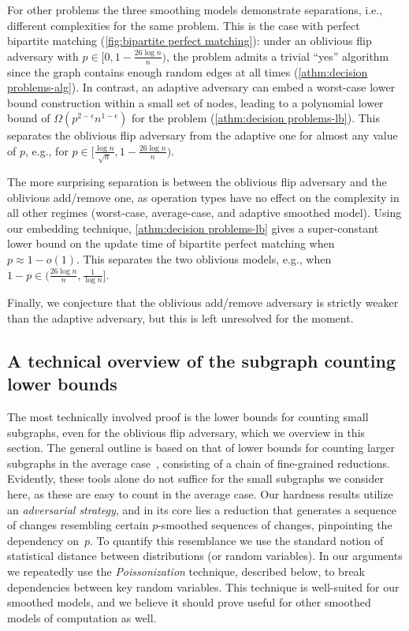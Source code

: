 \documentclass[letter,11pt]{article}
\begin{document}
For other problems the three smoothing models demonstrate separations, i.e., different complexities for the same problem.
This is the case with perfect bipartite matching (\cref{fig:bipartite perfect matching}):
under an oblivious flip adversary with $p\in[0,1-\frac{26\log n}{n})$, the problem admits a trivial ``yes'' algorithm since the graph contains enough random edges at all times (\cref{athm:decision problems-alg}).
In contrast, an adaptive adversary can embed a worst-case lower bound construction within a small set of nodes, leading to a polynomial lower bound of $\Omega(p^{2-\epsilon}n^{1-\epsilon})$ for the problem (\cref{athm:decision problems-lb}).
This separates the oblivious flip adversary from the adaptive one for almost any value of $p$, e.g., for $p\in \big[\frac{\log n}{\sqrt n},1-\frac{26\log n}{n}\big)$.

The more surprising separation is between the 
oblivious flip adversary and the oblivious add/remove one, 
as operation types have no effect on the complexity in all other regimes (worst-case, average-case, and adaptive smoothed model).
Using our embedding technique,  \cref{athm:decision problems-lb} gives a super-constant lower bound on the update time of bipartite perfect matching when $p \approx 1 - o(1)$. This separates the two oblivious models,
e.g.,
when $1 - p\in \big(\frac{26\log n}{n},\frac{1}{\log n}\big]$.


Finally, we conjecture that the oblivious add/remove adversary is strictly weaker than the adaptive adversary, but this is left unresolved for the moment.


\subsection{A technical overview of the subgraph counting lower bounds}
\label{sec:intro-technical}

The most technically involved proof is the lower bounds for counting small subgraphs, even for the oblivious flip adversary, which we overview in this section.
The general outline is based on that of lower bounds for counting larger subgraphs in the average case~\cite{HLS22}, consisting of a chain of fine-grained reductions.
Evidently, these tools alone do not suffice for the small subgraphs we consider here, as these are easy to count in the average case. 
Our hardness results utilize an \emph{adversarial strategy}, and in its core lies a reduction that generates a sequence of changes resembling certain $p$-smoothed sequences of changes, pinpointing the dependency on~$p$.
To quantify this resemblance we use the standard notion of statistical distance between distributions (or random variables). 
In our arguments we repeatedly use the \emph{Poissonization} technique, described below, to break dependencies between key random variables. 
This technique is well-suited for our smoothed models, and we believe it should prove useful for other smoothed models of computation as well.
\end{document}
